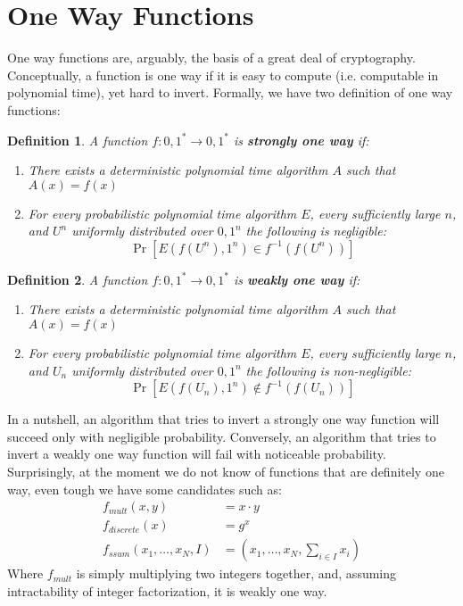 \documentclass{article}
\newtheorem{definition}{Definition}
\begin{document}
\section{One Way Functions}
One way functions are, arguably, the basis of a great deal of cryptography.
Conceptually, a function is one way if it is easy to compute (i.e. computable in polynomial time), yet hard to invert.
Formally, we have two definition of one way functions:
\begin{definition}
    A function $f: {0, 1}^* \to {0, 1}^*$ is \textbf{strongly one way} if:
    \begin{enumerate}
        \item There exists a deterministic polynomial time algorithm $A$ such that $A(x) = f(x)$
        \item For every probabilistic polynomial time algorithm $E$, every sufficiently large $n$, and $U^n$ uniformly distributed over ${0, 1}^n$ the following is negligible:
            \[ \Pr[E(f(U^n), 1^n) \in f^{-1}(f(U^n))  ] \]
    \end{enumerate}
\end{definition}
\begin{definition}
    A function $f: {0, 1}^* \to {0, 1}^*$ is \textbf{weakly one way} if:
    \begin{enumerate}
        \item There exists a deterministic polynomial time algorithm $A$ such that $A(x) = f(x)$
        \item For every probabilistic polynomial time algorithm $E$, every sufficiently large $n$, and $U_n$ uniformly distributed over ${0, 1}^n$ the following is non-negligible:
            \[ \Pr[E(f(U_n), 1^n) \notin f^{-1}(f(U_n))  ] \]
    \end{enumerate}
\end{definition}
In a nutshell, an algorithm that tries to invert a strongly one way function will succeed only with negligible probability.
Conversely, an algorithm that tries to invert a weakly one way function will fail with noticeable probability.
Surprisingly, at the moment we do not know of functions that are definitely one way, even tough we have some candidates such as:
\begin{align*}
    f_{mult}(x,y) &=  x \cdot y \\
    f_{discrete}(x) &= g^x \\
    f_{ssum}(x_1, \dots, x_N, I) &= (x_1, \dots, x_N, \sum_{i \in I} x_i)
\end{align*}
Where $f_{mult}$ is simply multiplying two integers together, and, assuming intractability of integer factorization, it is weakly one way.
\end{document}
